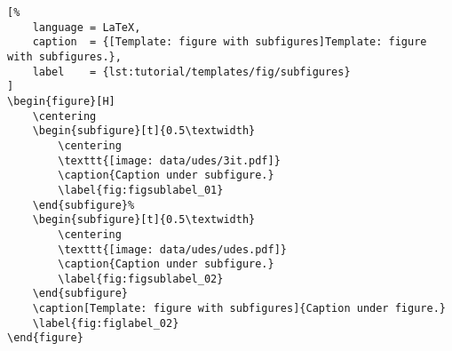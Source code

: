 \begin{lstlisting}[%
    language = LaTeX,
    caption  = {[Template: figure with subfigures]Template: figure with subfigures.},
    label    = {lst:tutorial/templates/fig/subfigures}
]
\begin{figure}[H]
    \centering
    \begin{subfigure}[t]{0.5\textwidth}
        \centering
        \texttt{[image: data/udes/3it.pdf]}
        \caption{Caption under subfigure.}
        \label{fig:figsublabel_01}
    \end{subfigure}%
    \begin{subfigure}[t]{0.5\textwidth}
        \centering
        \texttt{[image: data/udes/udes.pdf]}
        \caption{Caption under subfigure.}
        \label{fig:figsublabel_02}
    \end{subfigure}
    \caption[Template: figure with subfigures]{Caption under figure.}
    \label{fig:figlabel_02}
\end{figure}
\end{lstlisting}